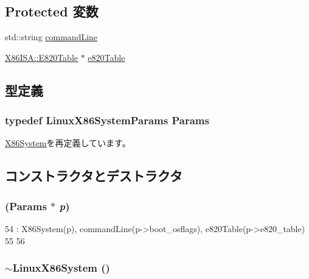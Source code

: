 \subsection*{Protected 変数}
\begin{DoxyCompactItemize}
\item 
std::string \hyperlink{classLinuxX86System_a3970bf75d55eef6014911ee4756e783c}{commandLine}
\item 
\hyperlink{classX86ISA_1_1E820Table}{X86ISA::E820Table} $\ast$ \hyperlink{classLinuxX86System_ab2edb73e83272dddc25211ddfdc6c7d4}{e820Table}
\end{DoxyCompactItemize}


\subsection{型定義}
\hypertarget{classLinuxX86System_a9a9d4fd080ddd5d649f7db5e47cfae8b}{
\subsubsection[{Params}]{\setlength{\rightskip}{0pt plus 5cm}typedef LinuxX86SystemParams {\bf Params}}}
\label{classLinuxX86System_a9a9d4fd080ddd5d649f7db5e47cfae8b}


\hyperlink{classX86System_a4f3142e3ba81ac1e14e960636ad3202b}{X86System}を再定義しています。

\subsection{コンストラクタとデストラクタ}
\hypertarget{classLinuxX86System_aa374e3ca639a89127a1ee9b0b6c0b346}{
\subsubsection[{LinuxX86System}]{ ({\bf Params} $\ast$ {\em p})}}
\label{classLinuxX86System_aa374e3ca639a89127a1ee9b0b6c0b346}



\begin{DoxyCode}
54     : X86System(p), commandLine(p->boot_osflags), e820Table(p->e820_table)
55 {
56 }
\end{DoxyCode}
\hypertarget{classLinuxX86System_ab5ad28d8a836f69bc8acbdd69d703062}{
\subsubsection[{$\sim$LinuxX86System}]{\setlength{\rightskip}{0pt plus 5cm}$\sim${\bf LinuxX86System} ()}}
\label{classLinuxX86System_ab5ad28d8a836f69bc8acbdd69d703062}



